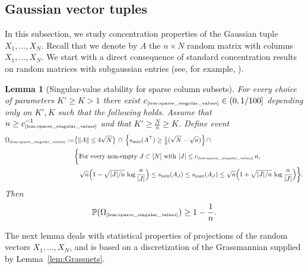 \documentclass[11pt]{amsart}
\newtheorem{lemma}[theorem]{Lemma}
\theoremstyle{definition}
\theoremstyle{plain}
\def\Prob{{\mathbb P}}
\def\Prob{{\mathbb P}}
\begin{document}
\subsection{Gaussian vector tuples}
In this subsection, we study
concentration properties of the Gaussian tuple $X_1,\dots,X_N$.
Recall that we denote by $A$ the $n\times N$
random matrix with columns $X_1,\dots,X_N$.
We start with a direct consequence of standard
concentration results on random matrices with
subgaussian entries (see, for example, \cite[Section~4.6]{Ver18}).

\begin{lemma}[Singular‐value stability for sparse column subsets]
  \label{lem:sparse_singular_values}
   For every choice of parameters $K'\geq K>1$ there exist $c_{\text{\tiny\ref{lem:sparse_singular_values}}}\in(0,1/100]$
  depending only on $K',K$ such that the following holds.
  Assume that $n\geq c_{\text{\tiny\ref{lem:sparse_singular_values}}}^{-1}$
  and that $K'\geq \frac{N}{n}\geq K$.
  Define event
  \begin{align*}
  \Omega_{\text{\tiny\ref{lem:sparse_singular_values}}}:=
  &\big\{\|A\| \le 4\sqrt{N}\big\}\,\cap\,
  \Big\{s_{\min}(A^\top) 
\ge \tfrac{1}{2}(\sqrt{N} - \sqrt{n})\Big\}\,\cap\\
  &\bigg\{\mbox{For every non-empty $J\subset[N]$ with $|J|\leq c_{\text{\tiny\ref{lem:sparse_singular_values}}}\,n$},\\
  &\hspace{0.3cm}\sqrt{n}\Bigl(1- 
  \sqrt{{|J|}/{n}}\,\log\frac{n}{|J|}  \Bigr)
      \le
      s_{\min}(A_J)
      \le
      s_{\max}(A_J)
      \le
      \sqrt{n}\Big(1+
      \sqrt{{|J|}/{n}}\,\log\frac{n}{|J|} \Big)
  \bigg\}.
  \end{align*}
Then 
$$
\Prob(\Omega_{\text{\tiny\ref{lem:sparse_singular_values}}})
\geq 1-\frac{1}{n}.
$$
\end{lemma}


The next lemma deals with statistical properties of projections
of the random vectors $X_1,\dots,X_N$,
and is based on a discretization of the Grassmannian
supplied by Lemma~\ref{lem:Grassnets}.
\end{document}
